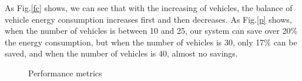 \documentclass[conference]{IEEEtran}
\begin{document}
As Fig.\ref{fc} shows, we can see that with the increasing of vehicles, the balance of vehicle energy consumption increases first and then decreases. 
As Fig.\ref{p} shows, when the number of vehicles is between 10 and 25, our system can save over 20\% the energy consumption, but when the number of vehicles is 30, only 17\% can be saved, and when the number of vehicles is 40, almost no savings. 
\begin{figure}[htbp]
	\centering
	\quad
	\caption{Performance metrics}
\end{figure}
\end{document}

